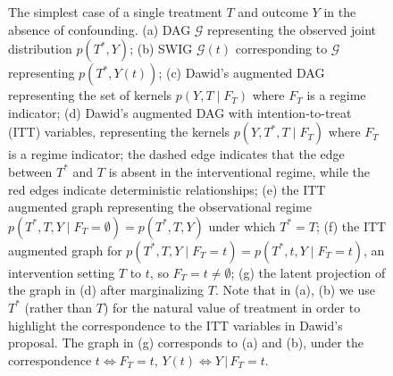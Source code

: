 \documentclass[11pt]{article}
\newcommand{\G}{{\mathscr G}}
\begin{document}
{\begin{figure}
\caption{ The simplest case of a single treatment $T$ and outcome $Y$ in the absence of confounding.
{\small (a) DAG $\G$ representing the observed joint distribution $p(T^*,Y)$; (b) SWIG ${\G}(t)$ corresponding to ${\G}$ representing $p(T^*,Y(t))$; (c) Dawid's augmented DAG representing the set of kernels $p(Y,T \mid F_T)$ where $F_T$ is a regime indicator;
(d) Dawid's augmented DAG with intention-to-treat (ITT) variables, representing the kernels $p(Y,T^*,T \mid F_T)$ where $F_T$ is a regime indicator; the dashed edge indicates that the edge between $T^*$ and $T$ is absent in the interventional regime, while the red edges indicate deterministic relationships;
 (e) the ITT augmented graph representing the observational regime $p(T^*,T, Y\mid F_T=\emptyset) = p(T^*,T, Y)$ under which $T^*=T$; 
 (f) the ITT augmented graph for $p(T^*,T, Y\mid F_T=t) = p(T^*,t, Y\mid F_T=t)$, 
  an intervention setting $T$ to $t$, so $F_T=t \neq \emptyset$;
(g) the latent projection of the graph in (d) after marginalizing $T$. 
Note that in (a), (b) we use $T^*$ (rather than $T$) for the natural value of treatment in order to highlight the correspondence to the ITT variables in Dawid's proposal. The graph in (g) corresponds to (a) and (b), under the correspondence $t \Leftrightarrow F_T\!=\!t$, $Y(t) \Leftrightarrow Y\,|\,F_T\!=\!t$.}
\label{fig:simple}}
\end{figure}




}
\end{document}
